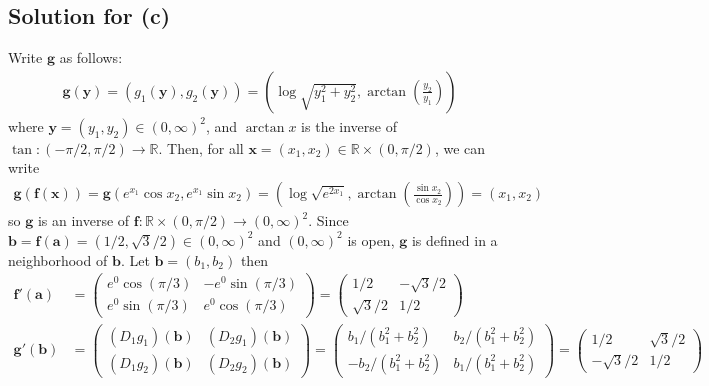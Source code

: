 \documentclass{scrartcl}
\begin{document}
\subsection{Solution for (c)}
Write \(\mathbf{g}\) as follows:
\begin{align*}
  \mathbf{g}(\mathbf{y})
  = (g_1(\mathbf{y}), g_2(\mathbf{y}))
  = \left( \log \sqrt{y^2_1 + y^2_2},
    \arctan \left( \frac{y_2}{y_1} \right) \right)
\end{align*}
where \(\mathbf{y} = (y_1, y_2) \in (0, \infty)^2\), and \(\arctan x\) is the
inverse of \(\tan: (-\pi / 2, \pi / 2) \to \mathbb{R}\). Then, for all
\(\mathbf{x} = (x_1, x_2) \in \mathbb{R} \times (0, \pi / 2)\), we can write
\begin{align*}
  \mathbf{g}(\mathbf{f}(\mathbf{x}))
  = \mathbf{g}(e^{x_1} \cos x_2, e^{x_1} \sin x_2)
  = \left( \log \sqrt{e^{2x_1}},
    \arctan \left( \frac{\sin x_2}{\cos x_2} \right) \right)
  = (x_1, x_2)
\end{align*}
so \(\mathbf{g}\) is an inverse of \(\mathbf{f}: \mathbb{R} \times (0, \pi / 2)
\to (0, \infty)^2\). Since \(\mathbf{b} = \mathbf{f}(\mathbf{a}) = (1/2,
\sqrt{3}/2) \in (0, \infty)^2\) and \((0, \infty)^2\) is open, \(\mathbf{g}\)
is defined in a neighborhood of \(\mathbf{b}\). Let \(\mathbf{b} = (b_1, b_2)\)
then
\begin{align*}
  \mathbf{f}'(\mathbf{a})
  &= \begin{pmatrix}
    e^0 \cos (\pi / 3) & -e^0 \sin (\pi / 3) \\
    e^0 \sin (\pi / 3) & e^0 \cos (\pi / 3)
  \end{pmatrix}
  = \begin{pmatrix}
    1 / 2 & -\sqrt{3} / 2 \\
    \sqrt{3} / 2 & 1 / 2
  \end{pmatrix} \\
  \mathbf{g}'(\mathbf{b})
  &= \begin{pmatrix}
    (D_1 g_1) (\mathbf{b}) & (D_2 g_1) (\mathbf{b}) \\
    (D_1 g_2) (\mathbf{b}) & (D_2 g_2) (\mathbf{b})
  \end{pmatrix}
  = \begin{pmatrix}
    b_1 / (b^2_1 + b^2_2) & b_2 / (b^2_1 + b^2_2) \\
    -b_2 / (b^2_1 + b^2_2) & b_1 / (b^2_1 + b^2_2)
  \end{pmatrix}
  = \begin{pmatrix}
    1 / 2 & \sqrt{3} / 2 \\
    -\sqrt{3} / 2 & 1 / 2
  \end{pmatrix}
\end{align*}
\end{document}
